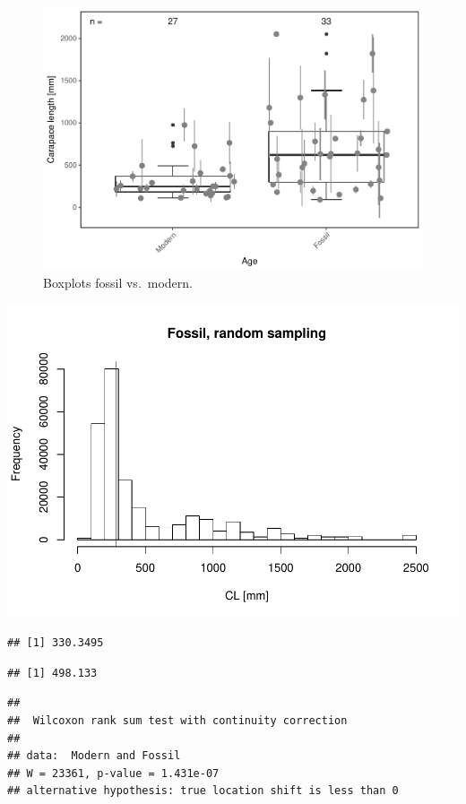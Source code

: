 \documentclass[]{article}
\begin{document}
\begin{figure}[htbp]
\centering
\includegraphics{MA_JJ_files/figure-latex/BPMF-1.pdf}
\caption{Boxplots fossil vs.~modern.}
\end{figure}

\includegraphics{MA_JJ_files/figure-latex/RSFM-1.pdf}

\begin{verbatim}
## [1] 330.3495
\end{verbatim}

\begin{verbatim}
## [1] 498.133
\end{verbatim}

\begin{verbatim}
## 
##  Wilcoxon rank sum test with continuity correction
## 
## data:  Modern and Fossil
## W = 23361, p-value = 1.431e-07
## alternative hypothesis: true location shift is less than 0
\end{verbatim}
\end{document}
